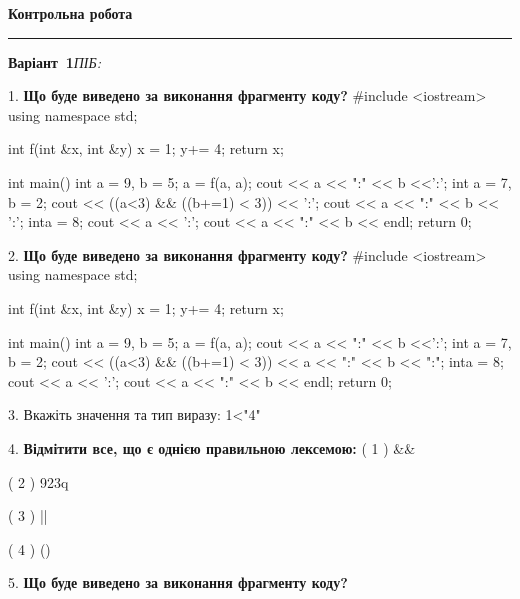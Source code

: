 \documentclass[11pt]{article}
\begin{document}
{\centering\Large\bfseries Контрольна робота\par}
\medskip
\noindent\rule{\linewidth}{0.5pt}
\smallskip
\noindent\textbf{Варіант \No\,1}\hfill \textit{ПІБ:}\,\underline{\hspace{60mm}}
\vspace{4mm}

1. \textbf{Що буде виведено за виконання фрагменту коду?}
#include <iostream>
using namespace std;

int f(int &x, int &y){
    x = 1;
    y+= 4;
    return x;
}

int main(){
    int a = 9, b = 5;
    a = f(a, a);
    cout << a << ":" << b <<':';
    {
        int a = 7, b = 2;
        cout << ((a<3) && ((b+=1) < 3)) << ':';
        cout << a << ":" << b << ':';
    }
    {
        inta = 8;
        cout << a << ':';
    }
    cout << a << ":" << b << endl;
    return 0;
}

\par\vspace{5mm}

2. \textbf{Що буде виведено за виконання фрагменту коду?}
#include <iostream>
using namespace std;

int f(int &x, int &y){
    x = 1;
    y+= 4;
    return x;
}

int main(){
    int a = 9, b = 5;
    a = f(a, a);
    cout << a << ":" << b <<':';
    {
        int a = 7, b = 2;
        cout << ((a<3) && ((b+=1) < 3))
             << a << ":" << b << ":";
    }
    {
        inta = 8;
        cout << a << ':';
    }
    cout << a << ":" << b << endl;
    return 0;
}

\par\vspace{5mm}

3. 
Вкажіть значення та тип виразу:
1<"4"
\par\vspace{5mm}

4. %
\textbf{Відмітити все, що є однією правильною лексемою:}
( 1 ) &&

( 2 ) 923q

( 3 ) ||

( 4 ) ()
\par\vspace{5mm}

5. \textbf{Що буде виведено за виконання фрагменту коду?}
\end{document}
